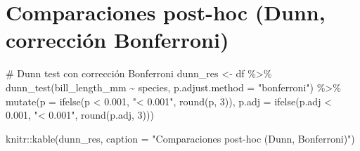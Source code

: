 \documentclass[
  spanish,
  11pt,
  a4paper,
  DIV=11,
  numbers=noendperiod]{scrartcl}
\newenvironment{Shaded}{\begin{snugshade}}{\end{snugshade}}
\newcommand{\AttributeTok}[1]{\textcolor[rgb]{0.40,0.45,0.13}{#1}}
\newcommand{\CommentTok}[1]{\textcolor[rgb]{0.37,0.37,0.37}{#1}}
\newcommand{\DecValTok}[1]{\textcolor[rgb]{0.68,0.00,0.00}{#1}}
\newcommand{\FloatTok}[1]{\textcolor[rgb]{0.68,0.00,0.00}{#1}}
\newcommand{\FunctionTok}[1]{\textcolor[rgb]{0.28,0.35,0.67}{#1}}
\newcommand{\NormalTok}[1]{\textcolor[rgb]{0.00,0.23,0.31}{#1}}
\newcommand{\OtherTok}[1]{\textcolor[rgb]{0.00,0.23,0.31}{#1}}
\newcommand{\SpecialCharTok}[1]{\textcolor[rgb]{0.37,0.37,0.37}{#1}}
\newcommand{\StringTok}[1]{\textcolor[rgb]{0.13,0.47,0.30}{#1}}
\begin{document}
\section{Comparaciones post-hoc (Dunn, corrección
Bonferroni)}\label{comparaciones-post-hoc-dunn-correcciuxf3n-bonferroni}

\begin{Shaded}
\begin{Highlighting}[numbers=left,,]
\CommentTok{\# Dunn test con corrección Bonferroni}
\NormalTok{dunn\_res }\OtherTok{\textless{}{-}}\NormalTok{ df }\SpecialCharTok{\%\textgreater{}\%}
  \FunctionTok{dunn\_test}\NormalTok{(bill\_length\_mm }\SpecialCharTok{\textasciitilde{}}\NormalTok{ species, }\AttributeTok{p.adjust.method =} \StringTok{"bonferroni"}\NormalTok{) }\SpecialCharTok{\%\textgreater{}\%}
  \FunctionTok{mutate}\NormalTok{(}\AttributeTok{p =} \FunctionTok{ifelse}\NormalTok{(p }\SpecialCharTok{\textless{}} \FloatTok{0.001}\NormalTok{, }\StringTok{"\textless{} 0.001"}\NormalTok{, }\FunctionTok{round}\NormalTok{(p, }\DecValTok{3}\NormalTok{)),}
         \AttributeTok{p.adj =} \FunctionTok{ifelse}\NormalTok{(p.adj }\SpecialCharTok{\textless{}} \FloatTok{0.001}\NormalTok{, }\StringTok{"\textless{} 0.001"}\NormalTok{, }\FunctionTok{round}\NormalTok{(p.adj, }\DecValTok{3}\NormalTok{)))}

\NormalTok{knitr}\SpecialCharTok{::}\FunctionTok{kable}\NormalTok{(dunn\_res, }\AttributeTok{caption =} \StringTok{"Comparaciones post{-}hoc (Dunn, Bonferroni)"}\NormalTok{)}
\end{Highlighting}
\end{Shaded}
\end{document}
